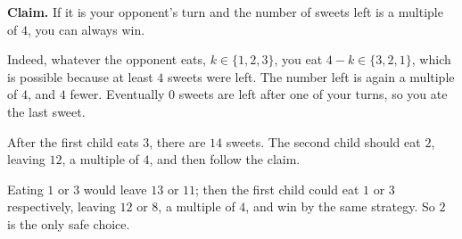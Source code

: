 \textbf{Claim.} If it is your opponent's turn and the number of sweets left is a multiple of $4$, you can always win.

Indeed, whatever the opponent eats, $k\in\{1,2,3\}$, you eat $4-k\in\{3,2,1\}$, which is possible because at least $4$ sweets were left. The number left is again a multiple of $4$, and $4$ fewer. Eventually $0$ sweets are left after one of your turns, so you ate the last sweet.

After the first child eats $3$, there are $14$ sweets. The second child should eat $\boxed{2}$, leaving $12$, a multiple of $4$, and then follow the claim.

Eating $1$ or $3$ would leave $13$ or $11$; then the first child could eat $1$ or $3$ respectively, leaving $12$ or $8$, a multiple of $4$, and win by the same strategy. So $2$ is the only safe choice.
